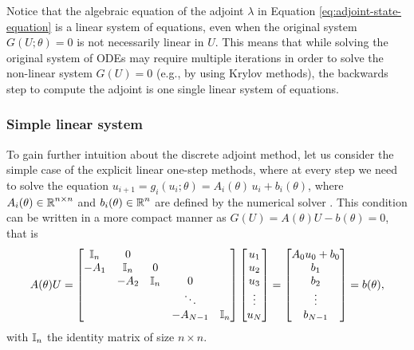 Notice that the algebraic equation of the adjoint $\lambda$ in Equation \eqref{eq:adjoint-state-equation} is a linear system of equations, even when the original system $G(U; \theta)=0$ is not necessarily linear in $U$.
This means that while solving the original system of ODEs may require multiple iterations in order to solve the non-linear system $G(U) = 0$ (e.g., by using Krylov methods), the backwards step to compute the adjoint is one single linear system of equations. 

\subsubsection{Simple linear system}

To gain further intuition about the discrete adjoint method, let us consider the simple case of the explicit linear one-step methods, where at every step we need to solve the equation $u_{i+1} = g_i (u_i; \theta) = A_i (\theta) \, u_i + b_i(\theta)$, where $A_i(\theta) \in \operatorname{\mathbb{R}}^{n \times n}$ and $b_i(\theta) \in \operatorname{\mathbb{R}}^n$ are defined by the numerical solver \cite{Johnson}. 
This condition can be written in a more compact manner as $G(U)=A(\theta) U - b(\theta) = 0$, that is 
\begin{equation}
    A(\theta) U 
    = 
    \begin{bmatrix}
        \operatorname{\mathbb{I}}_{n} & 0 &   &  & \\
        -A_1 & \operatorname{\mathbb{I}}_{n} & 0 &  &  \\
          & -A_2 & \operatorname{\mathbb{I}}_{n} & 0 &  \\
         &  &   & \ddots &   \\
         &  &  & -A_{N-1} & \operatorname{\mathbb{I}}_{n}
    \end{bmatrix}
    \begin{bmatrix}
        u_1 \\
        u_2 \\
        u_3 \\
        \vdots \\
        u_N
    \end{bmatrix}
    = 
    \begin{bmatrix}
        A_0 u_0 + b_0 \\
        b_1 \\
        b_2 \\
        \vdots \\
        b_{N-1}
    \end{bmatrix}
    = 
    b(\theta), 
\end{equation}
with $\operatorname{\mathbb{I}}_{n}$ the identity matrix of size $n \times n$.
